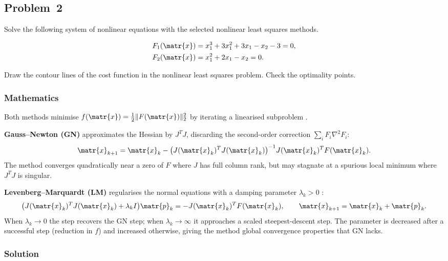 \subsection{Problem~2}%
\label{problem:2}

Solve the following system of nonlinear equations with the selected nonlinear
least squares methods.

\begin{align*}
  F_1(\matr{x}) &= x_1^3 + 3x_1^2 + 3x_1 - x_2 - 3 = 0, \\
  F_2(\matr{x}) &= x_1^2 + 2x_1 - x_2 = 0.
\end{align*}

Draw the contour lines of the cost function in the nonlinear least squares problem.
Check the optimality points.

\subsubsection*{Mathematics}

Both methods minimise $f(\matr{x}) = \tfrac{1}{2}\|F(\matr{x})\|_2^2$ by iterating
a linearised subproblem \citep{NoceWrig99}.

\textbf{Gauss--Newton (GN)} approximates the Hessian by $J^T J$, discarding the
second-order correction $\sum_i F_i \nabla^2 F_i$:
\begin{equation*}
  \matr{x}_{k+1} = \matr{x}_k
    - \bigl(J(\matr{x}_k)^T J(\matr{x}_k)\bigr)^{-1} J(\matr{x}_k)^T F(\matr{x}_k).
\end{equation*}
The method converges quadratically near a zero of $F$ where $J$ has full column
rank, but may stagnate at a spurious local minimum where $J^T J$ is singular.

\textbf{Levenberg--Marquardt (LM)} regularises the normal equations with a damping
parameter $\lambda_k > 0$ \citep{NoceWrig99}:
\begin{equation*}
  \bigl(J(\matr{x}_k)^T J(\matr{x}_k) + \lambda_k I\bigr)\matr{p}_k
      = -J(\matr{x}_k)^T F(\matr{x}_k),
  \qquad
  \matr{x}_{k+1} = \matr{x}_k + \matr{p}_k.
\end{equation*}
When $\lambda_k \to 0$ the step recovers the GN step; when $\lambda_k \to \infty$
it approaches a scaled steepest-descent step.  The parameter is decreased after a
successful step (reduction in $f$) and increased otherwise, giving the method
global convergence properties that GN lacks.

\subsubsection*{Solution}

